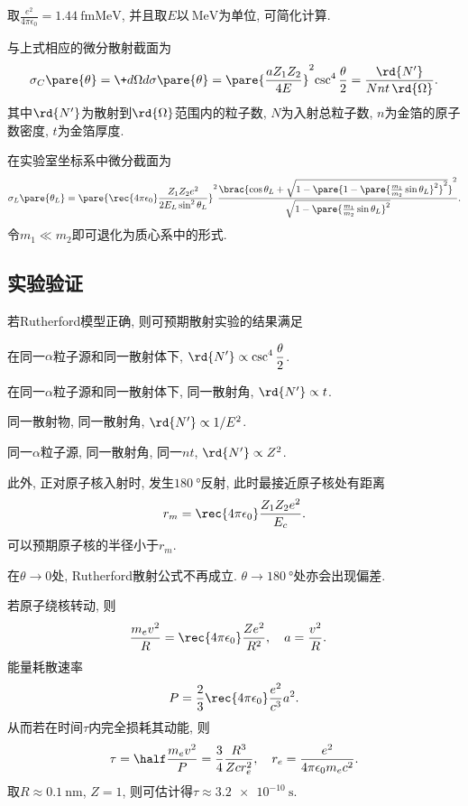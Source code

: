 \documentclass{ctexart}
\begin{document}
\begin{remark}
    取$\displaystyle \frac{e^2}{4\pi\epsilon_0} = \SI{1.44}{\femto\meter\mega\eV}$, 并且取$E$以$\SI{}{\mega\eV}$为单位, 可简化计算.
\end{remark}

与上式相应的微分散射截面为
\[ \sigma_C\pare{\theta} = \+d\Omega d{\sigma\pare{\theta}} = \pare{\frac{aZ_1Z_2}{4E}}^2{\csc^4\frac{\theta}{2}} = \frac{\rd{N'}}{Nnt\,\rd{\Omega}}. \]
其中$\rd{N'}$为散射到$\rd{\Omega}$范围内的粒子数, $N$为入射总粒子数, $n$为金箔的原子数密度, $t$为金箔厚度.

\begin{remark}
    在实验室坐标系中微分截面为
    \[ \sigma_L\pare{\theta_L} = \pare{\rec{4\pi\epsilon_0} \frac{Z_1Z_2e^2}{2E_L\sin^2\theta_L}}^2 \frac{\brac{\cos\theta_L + \sqrt{1-\pare{1-\pare{\frac{m_1}{m_2}\sin\theta_L}^2}^2}}^2}{\sqrt{1-\pare{\frac{m_1}{m_2}\sin\theta_L}^2}}. \]
    令$m_1\ll m_2$即可退化为质心系中的形式.
\end{remark}


\subsection{实验验证} %
\label{sub:实验验证}

若Rutherford模型正确, 则可预期散射实验的结果满足
\begin{cenum}
    \item 在同一$\alpha$粒子源和同一散射体下, $\displaystyle \rd{N'}\propto \csc^4 \frac{\theta}{2}$.
    \item 在同一$\alpha$粒子源和同一散射体下, 同一散射角, $\rd{N'}\propto t$.
    \item 同一散射物, 同一散射角, $\rd{N'}\propto 1/E^2$.
    \item 同一$\alpha$粒子源, 同一散射角, 同一$nt$, $\rd{N'}\propto Z^2$.
\end{cenum}
此外, 正对原子核入射时, 发生$\SI{180}{\degree}$反射, 此时最接近原子核处有距离
\[ r_m = \rec{4\pi\epsilon_0} \frac{Z_1Z_2e^2}{E_c}. \]
可以预期原子核的半径小于$r_m$.

\begin{remark}
    在$\theta\rightarrow 0$处, Rutherford散射公式不再成立. $\theta\rightarrow \SI{180}{\degree}$处亦会出现偏差.
\end{remark}

\begin{remark}
    若原子绕核转动, 则
    \begin{align*}
        \frac{m_e v^2}{R} &= \rec{4\pi\epsilon_0} \frac{Ze^2}{R^2},\quad a = \frac{v^2}{R}.
    \end{align*}
    能量耗散速率
    \[ P = \frac{2}{3}\rec{4\pi\epsilon_0} \frac{e^2}{c^3}a^2. \]
    从而若在时间$\tau$内完全损耗其动能, 则
    \[ \tau = \half \frac{m_ev^2}{P} = \frac{3}{4} \frac{R^3}{Zcr_e^2},\quad r_e = \frac{e^2}{4\pi\epsilon_0 m_ec^2}. \]
    取$R\approx\SI{0.1}{\nano\meter}$, $Z=1$, 则可估计得$\tau\approx \SI{3.2e-10}{\second}$.
\end{remark}


\end{document}
